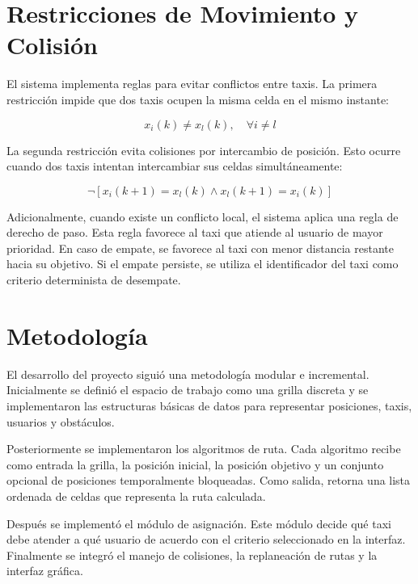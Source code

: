 \documentclass[12pt,a4paper]{article}
\begin{document}
\section{Restricciones de Movimiento y Colisión}
\justifying

El sistema implementa reglas para evitar conflictos entre taxis. La primera restricción impide que dos taxis ocupen la misma celda en el mismo instante:

\begin{equation}
x_i(k) \neq x_l(k), \quad \forall i \neq l
\end{equation}

La segunda restricción evita colisiones por intercambio de posición. Esto ocurre cuando dos taxis intentan intercambiar sus celdas simultáneamente:

\begin{equation}
\neg \left[x_i(k+1)=x_l(k) \land x_l(k+1)=x_i(k)\right]
\end{equation}

Adicionalmente, cuando existe un conflicto local, el sistema aplica una regla de derecho de paso. Esta regla favorece al taxi que atiende al usuario de mayor prioridad. En caso de empate, se favorece al taxi con menor distancia restante hacia su objetivo. Si el empate persiste, se utiliza el identificador del taxi como criterio determinista de desempate.

\section{Metodología}
\justifying

El desarrollo del proyecto siguió una metodología modular e incremental. Inicialmente se definió el espacio de trabajo como una grilla discreta y se implementaron las estructuras básicas de datos para representar posiciones, taxis, usuarios y obstáculos.

Posteriormente se implementaron los algoritmos de ruta. Cada algoritmo recibe como entrada la grilla, la posición inicial, la posición objetivo y un conjunto opcional de posiciones temporalmente bloqueadas. Como salida, retorna una lista ordenada de celdas que representa la ruta calculada.

Después se implementó el módulo de asignación. Este módulo decide qué taxi debe atender a qué usuario de acuerdo con el criterio seleccionado en la interfaz. Finalmente se integró el manejo de colisiones, la replaneación de rutas y la interfaz gráfica.
\end{document}
